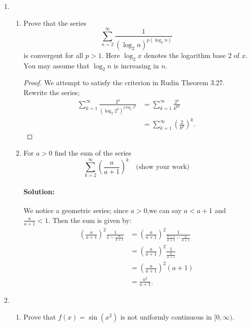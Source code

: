 \documentclass{article}
\begin{document}
\begin{enumerate} 

\item \begin{enumerate}
        \item Prove that the series $$\sum_{n=2}^\infty\frac1{(\log_2n)^{p(\log_2n)}}$$
        is convergent for all $p>1.$ Here $\log_2x$ denotes the logarithm base 2 of $x.$ You may assume
        that $\log_2n$ is increasing in $n.$

        \begin{proof} 
            We attempt to satisfy the criterion in Rudin Theorem 3.27. Rewrite the series;
            \begin{align*}
                \sum_{k=1}^{\infty} \frac{2^k}{\left(\log_2 2^k\right)^{p\log_2 2^k}}&= \sum_{k=1}^{\infty} \frac{2^{k}}{k^{pk}}\\
                &= \sum_{k=1}^{\infty} \left( \frac{2}{k^{p}} \right) ^{k} %
            .\end{align*}
        \end{proof}

        \item For $a>0$ find the sum of the series
        $$\sum_{k=2}^\infty\left(\frac a{a+1}\right)^k\quad\text{(show your work)}$$

        \paragraph{Solution: }We notice a geometric series; since $a>0$,we can say $a<a+1$ and $\frac{a}{a+1}<1$.
        Then the sum is given by:
        \begin{align*}
            \left(\frac{a}{a+1}\right)^2 \frac{1}{1-\frac{a}{a+1}}
            &= \left(\frac{a}{a+1}\right)^2 \frac{1}{\frac{a+1}{a+1}-\frac{a}{a+1}}\\
            &= \left(\frac{a}{a+1}\right)^2 \frac{1}{\frac{1}{a+1}}\\
            &= \left(\frac{a}{a+1}\right)^2 (a+1)\\
            &=\frac{a^2}{a+1}
        .\end{align*}

    \end{enumerate}
\item \begin{enumerate}
        \item Prove that $f\left(x\right)=\sin\left(x^{2}\right)$ is not uniformly continuous in $[0,\infty).$


\end{enumerate}
\end{enumerate}
\end{document}
